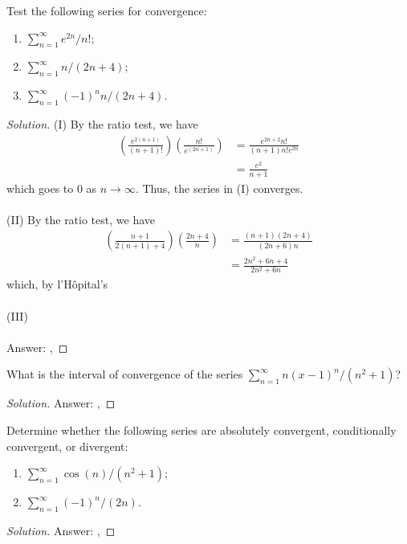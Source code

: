 \begin{problem}
Test the following series for convergence:
\begin{enumerate}[label=(\MakeUppercase{\roman*})]
\item $\sum_{n=1}^\infty e^{2n}/n!$;
\item $\sum_{n=1}^\infty n/(2n+4)$;
\item $\sum_{n=1}^\infty (-1)^nn/(2n+4)$.
\end{enumerate}
\end{problem}
\begin{proof}[Solution]
(I) By the ratio test, we have
\[\begin{aligned}
\left(\frac{e^{2(n+1)}}{(n+1)!}\right)\left(\frac{n!}{e^{(2n+1)}}\right)&=
\frac{e^{2n+2}n!}{(n+1)n!e^{2n}}\\
&=\frac{e^2}{n+1}
\end{aligned}\]
which goes to $0$ as $n\to\infty$. Thus, the series in (I) converges.
\\\\
(II) By the ratio test, we have
\begin{align*}
\left(\frac{n+1}{2(n+1)+4}\right)
\left(\frac{2n+4}{n}\right)
&=\frac{(n+1)(2n+4)}{(2n+6)n}\\
&=\frac{2n^2+6n+4}{2n^2+6n}
\end{align*}
which, by l'Hôpital's
\\\\
(III)
\\\\
Answer: {\color{Green}}, {\color{Red}}
\end{proof}

\begin{problem}
What is the interval of convergence of the series $\sum_{n=1}^\infty
n(x-1)^n/(n^2+1)$?
\end{problem}
\begin{proof}[Solution]
Answer: {\color{Green}}, {\color{Red}}
\end{proof}

\begin{problem}
Determine whether the following series are absolutely convergent,
conditionally convergent, or divergent:
\begin{enumerate}[label=(\MakeUppercase{\roman*})]
\item $\sum_{n=1}^\infty\cos(n)/(n^2+1)$;
\item $\sum_{n=1}^\infty(-1)^n/(2n)$.
\end{enumerate}
\end{problem}
\begin{proof}[Solution]
Answer: {\color{Green}}, {\color{Red}}
\end{proof}

